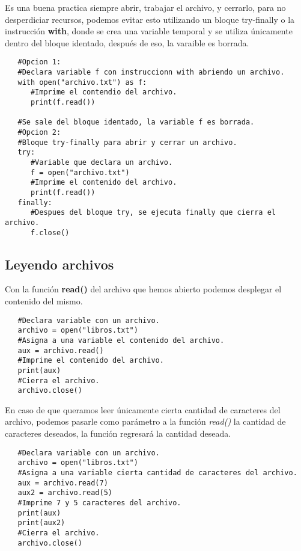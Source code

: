 Es una buena practica siempre abrir, trabajar el archivo, y cerrarlo, para no desperdiciar recursos, podemos evitar esto utilizando un bloque try-finally o la instrucción \textbf{with}, donde se crea una variable temporal y se utiliza únicamente dentro del bloque identado, después de eso, la varaible es borrada.
\begin{lstlisting}
   #Opcion 1:
   #Declara variable f con instruccionn with abriendo un archivo.
   with open("archivo.txt") as f:
      #Imprime el contendio del archivo.
      print(f.read())
      
   #Se sale del bloque identado, la variable f es borrada.
   #Opcion 2:
   #Bloque try-finally para abrir y cerrar un archivo.
   try:
      #Variable que declara un archivo.
      f = open("archivo.txt")
      #Imprime el contenido del archivo.
      print(f.read())
   finally:
      #Despues del bloque try, se ejecuta finally que cierra el archivo.
      f.close()
\end{lstlisting}


\subsection{Leyendo archivos}
\hspace{0.55cm}Con la función \textbf{read()} del archivo que hemos abierto podemos desplegar el contenido del mismo.
\begin{lstlisting}
   #Declara variable con un archivo.
   archivo = open("libros.txt")
   #Asigna a una variable el contenido del archivo.
   aux = archivo.read()
   #Imprime el contenido del archivo.
   print(aux)
   #Cierra el archivo.
   archivo.close()
\end{lstlisting}

En caso de que queramos leer únicamente cierta cantidad de caracteres del archivo, podemos pasarle como parámetro a la función \textit{read()} la cantidad de caracteres deseados, la función regresará la cantidad deseada.
\begin{lstlisting}
   #Declara variable con un archivo.
   archivo = open("libros.txt")
   #Asigna a una variable cierta cantidad de caracteres del archivo.
   aux = archivo.read(7)
   aux2 = archivo.read(5)
   #Imprime 7 y 5 caracteres del archivo.
   print(aux)
   print(aux2)
   #Cierra el archivo.
   archivo.close()
\end{lstlisting}

